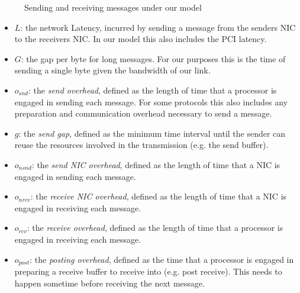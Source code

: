 \begin{figure}[!htp]
\begin{center}
\end{center}
\caption{Sending and receiving messages under our model}
\label{fig:model-base}
\end{figure}




\begin{itemize}
  \item $L$: the network Latency, incurred by sending a message from the senders NIC to the receivers NIC. In our model 
    this also includes the PCI latency.
  \item $G$: the gap per byte for long messages. For our purposes this is the time of sending a single byte given the 
     bandwidth of our link.
  \item $o_{snd}$: the \emph{send overhead}, defined as the length of time that a processor is engaged in sending each message.
    For some protocols this also includes any preparation and communication overhead necessary to send a message.
  \item $g$: the \emph{send gap}, defined as the minimum time interval until the sender can reuse the resources involved in 
    the transmission (e.g. the send buffer).
  \item $o_{nsnd}$: the \emph{send NIC overhead}, defined as the length of time that a NIC is engaged in sending each message.
  \item $o_{nrcv}$: the \emph{receive NIC overhead}, defined as the length of time that a NIC is engaged in receiving each message.
  \item $o_{rcv}$: the \emph{receive overhead}, defined as the length of time that a processor is engaged in receiving each message.
  \item $o_{post}$: the \emph{posting overhead}, defined as the time that a processor is engaged in preparing a receive buffer
    to receive into (e.g. post receive). This needs to happen sometime before receiving the next message.
\end{itemize}

